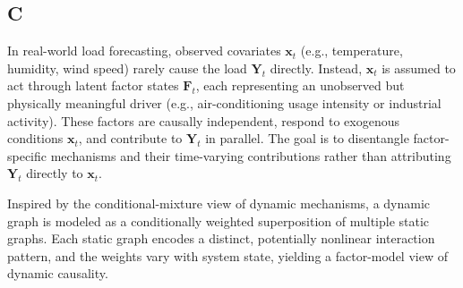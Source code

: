 ﻿\documentclass[journal]{IEEEtran}
\newenvironment{auditproblemblock}{\begingroup\color{red}}{\endgroup}
\begin{document}






\begin{auditproblemblock}
\subsection{C}
In real-world load forecasting, observed covariates $\mathbf{x}_t$ (e.g., temperature, humidity, wind speed) rarely cause the load $\mathbf{Y}_t$ directly. Instead, $\mathbf{x}_t$ is assumed to act through latent factor states $\mathbf{F}_t$, each representing an unobserved but physically meaningful driver (e.g., air-conditioning usage intensity or industrial activity). These factors are causally independent, respond to exogenous conditions $\mathbf{x}_t$, and contribute to $\mathbf{Y}_t$ in parallel. The goal is to disentangle factor-specific mechanisms and their time-varying contributions rather than attributing $\mathbf{Y}_t$ directly to $\mathbf{x}_t$. 

Inspired by the conditional-mixture view of dynamic mechanisms, a dynamic graph is modeled as a conditionally weighted superposition of multiple static graphs. Each static graph encodes a distinct, potentially nonlinear interaction pattern, and the weights vary with system state, yielding a factor-model view of dynamic causality.
\end{auditproblemblock}
\end{document}
